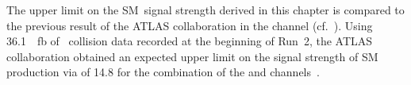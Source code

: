 %

The upper limit on the SM~\HH signal strength derived in this chapter is
compared to the previous result of the ATLAS collaboration in the \bbtautau
channel (cf.~). Using \SI{36.1}{\per\femto\barn}
of \pp~collision data recorded at the beginning of Run~2, the ATLAS
collaboration obtained an expected upper limit on the signal strength of SM~\HH
production via \ggF of 14.8 for the combination of the \lephad and \hadhad
channels~\cite{HIGG-2016-16-witherratum}.


